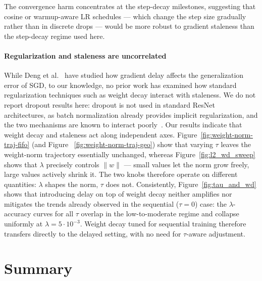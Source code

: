 \documentclass[10pt,conference,compsocconf]{IEEEtran}
\begin{document}
The convergence harm concentrates at the step-decay milestones, suggesting
that cosine or warmup-aware LR schedules --- which change the step size
gradually rather than in discrete drops --- would be more robust to gradient
staleness than the step-decay regime used here.

\paragraph{Regularization and staleness are uncorrelated}
While Deng et al.~\cite{deng2025generalizability} have studied how
gradient delay affects the generalization error of SGD, to our
knowledge, no prior work has examined how standard regularization
techniques such as weight decay interact with staleness. We do not
report dropout results here: dropout is not used in standard ResNet
architectures, as batch normalization already provides implicit
regularization, and the two mechanisms are known to interact
poorly~\cite{li2018understandingdisharmonydropoutbatch}.
Our results indicate that weight decay and staleness act along
independent axes. Figure~\ref{fig:weight-norm-traj-fifo} (and Figure ~\ref{fig:weight-norm-traj-geo}) show that
varying $\tau$ leaves the weight-norm trajectory essentially unchanged,
whereas Figure~\ref{fig:l2_wd_sweep} shows that $\lambda$ precisely
controls $\|w\|$ — small values let the norm grow freely, large values
actively shrink it. The two knobs therefore operate on different
quantities: $\lambda$ shapes the norm, $\tau$ does not. Consistently,
Figure~\ref{fig:tau_and_wd} shows that introducing delay on top of
weight decay neither amplifies nor mitigates the trends already
observed in the sequential ($\tau{=}0$) case: the $\lambda$-accuracy
curves for all $\tau$ overlap in the low-to-moderate regime and
collapse uniformly at $\lambda = 5\cdot 10^{-3}$. Weight decay tuned
for sequential training therefore transfers directly to the delayed
setting, with no need for $\tau$-aware adjustment.

\section{Summary}
\end{document}

